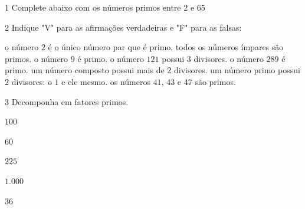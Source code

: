 

\num{1}  Complete abaixo com os números primos entre $2$ e $65$



\num{2}  Indique "V" para as afirmações verdadeiras e "F" para as falsas:

\begin{boxlist}
\boxitem[\rosa{V}] o número $2$ é o único número par que é primo.
\boxitem[\rosa{F}] todos os números ímpares são primos.
\boxitem[\rosa{F}] o número $9$ é primo.
\boxitem[\rosa{V}] o número $121$ possui $3$ divisores.
\boxitem[\rosa{F}] o número $289$ é primo.
\boxitem[\rosa{V}] um número composto possui mais de $2$ divisores.
\boxitem[\rosa{V}] um número primo possui $2$ divisores: o $1$ e ele mesmo.
\boxitem[\rosa{V}] os números $41$, $43$ e $47$ são primos.
\end{boxlist}


\num{3} Decomponha em fatores primos.

\begin{escolha}
\item  $100$    
\item  $60$     
\item  $225$    
\item  $1.000$  
\item  $36$     
\end{escolha}

